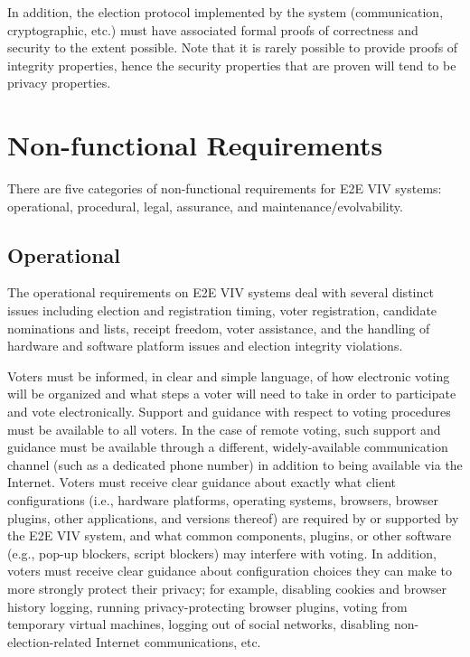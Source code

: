 In addition, the election protocol implemented by the system
(communication, cryptographic, etc.) must have associated formal
proofs of correctness and security to the extent possible. Note that it is rarely possible to provide proofs of integrity properties, hence the security properties that are proven will tend to be privacy properties. 


\section{Non-functional Requirements}
There are five categories of non-functional requirements for E2E VIV
systems: operational, procedural, legal, assurance, and
maintenance/evolvability.

\subsection{Operational}
\label{req:operational}

The operational requirements on E2E VIV systems deal with several
distinct issues including election and registration timing, voter
registration, candidate nominations and lists, receipt freedom, voter
assistance, and the handling of hardware and software platform issues
and election integrity violations.

Voters must be informed, in clear and simple language, of how
electronic voting will be organized and what steps a voter will need
to take in order to participate and vote electronically. Support and
guidance with respect to voting procedures must be available to all
voters. In the case of remote voting, such support and guidance must
be available through a different, widely-available communication
channel (such as a dedicated phone number) in addition to being
available via the Internet. Voters must receive clear guidance about
exactly what client configurations (i.e., hardware platforms,
operating systems, browsers, browser plugins, other applications, and
versions thereof) are required by or supported by the E2E VIV system,
and what common components, plugins, or other software (e.g., pop-up
blockers, script blockers) may interfere with voting. In addition,
voters must receive clear guidance about configuration choices they
can make to more strongly protect their privacy; for example,
disabling cookies and browser history logging, running
privacy-protecting browser plugins, voting from temporary virtual
machines, logging out of social networks, disabling
non-election-related Internet communications, etc.

